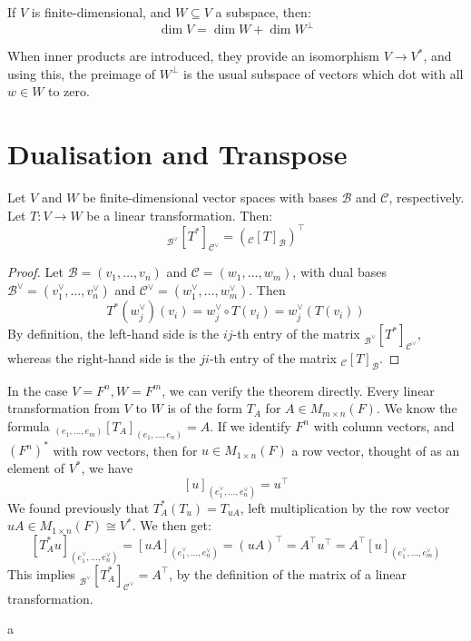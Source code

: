 \documentclass[../linear_algebra_and_groups.tex]{subfiles}
\begin{document}
\begin{proposition}
    \begin{shaded*}
    If $V$ is finite-dimensional, and $W \subseteq V$ a subspace, then:
    \[ \dim V = \dim W + \dim W^\perp \]
    \end{shaded*}
\end{proposition}

\begin{remark}
    When inner products are introduced, they provide an isomorphism $V \to V^*$, and using this, the preimage of $W^\perp$ is the usual subspace of vectors which dot with all $w \in W$ to zero.
\end{remark}

\section{Dualisation and Transpose}

\begin{theorem}
    \begin{shaded*}
        Let $V$ and $W$ be finite-dimensional vector spaces with bases $\mathcal{B}$ and $\mathcal{C}$, respectively. Let $T : V \to W$ be a linear transformation. Then:
        \[ {}_{\mathcal{B}^\vee}[T^*]_{\mathcal{C}^\vee} = ({}_{\mathcal{C}}[T]_{\mathcal{B}})^\top \]
    \end{shaded*}
\end{theorem}
\begin{proof}
    Let $\mathcal{B} = (v_1, \dots, v_n)$ and $\mathcal{C} = (w_1, \dots, w_m)$, with dual bases $\mathcal{B}^\vee = (v_1^\vee, \dots, v_n^\vee)$ and $\mathcal{C}^\vee = (w_1^\vee, \dots, w_m^\vee)$. Then
    \[ T^*(w_j^\vee)(v_i) = w_j^\vee \circ T(v_i) = w_j^\vee(T(v_i)) \]
    By definition, the left-hand side is the $ij$-th entry of the matrix ${}_{\mathcal{B}^\vee}[T^*]_{\mathcal{C}^\vee}$, whereas the right-hand side is the $ji$-th entry of the matrix ${}_{\mathcal{C}}[T]_{\mathcal{B}}$.
    \qedhere
\end{proof}

\begin{example}
    In the case $V = F^n, W = F^m$, we can verify the theorem directly. Every linear transformation from $V$ to $W$ is of the form $T_A$ for $A \in M_{m\times n}(F)$. We know the formula ${}_{(e_1, \dots, e_m)}[T_A]_{(e_1, \dots, e_n)} = A$. If we identify $F^n$ with column vectors, and $(F^n)^*$ with row vectors, then for $u \in M_{1\times n}(F)$ a row vector, thought of as an element of $V^*$, we have
    \[ [u]_{(e_1^\vee, \dots, e_n^\vee)} = u^\top \]
    We found previously that $T_A^*(T_u) = T_{uA}$, left multiplication by the row vector $uA \in M_{1\times n}(F) \cong V^*$. We then get:
    \[ [T_A^* u]_{(e_1^\vee, \dots, e_n^\vee)} = [uA]_{(e_1^\vee, \dots, e_n^\vee)} = (uA)^\top = A^\top u^\top = A^\top [u]_{(e_1^\vee, \dots, e_m^\vee)} \]
    This implies ${}_{\mathcal{B}^\vee}[T_A^*]_{\mathcal{C}^\vee} = A^\top$, by the definition of the matrix of a linear transformation.
\end{example}



\newpage
a
\end{document}
